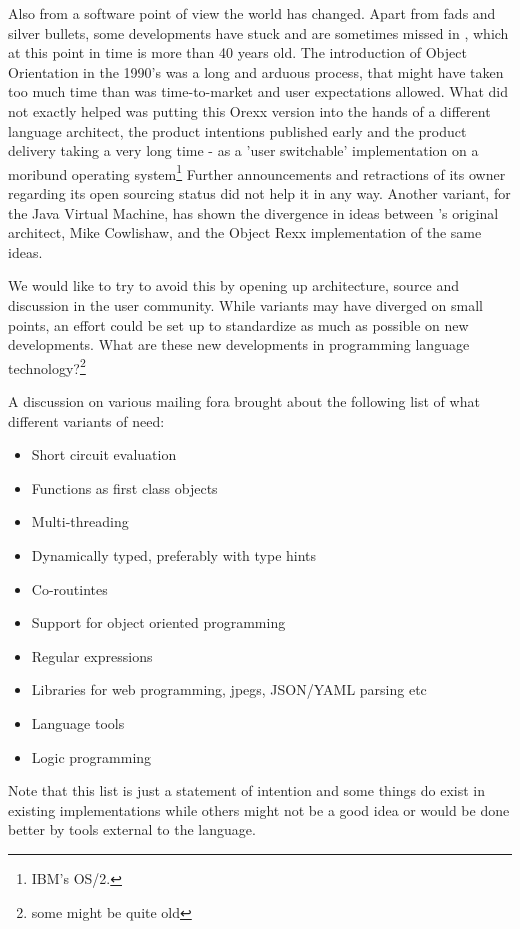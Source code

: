 Also from a software point of view the world has changed. Apart from
fads and silver bullets, some developments have stuck and are
sometimes missed in \rexx{}, which at this point in time is more than
40 years old. The introduction of Object Orientation in the 1990's was
a long and arduous process, that might have taken too much time than
was time-to-market and user expectations allowed. What did not exactly
helped was putting this Orexx version into the hands of a different
language architect, the product intentions published early and the
product delivery taking a very long time - as a 'user switchable'
implementation on a moribund operating
system\footnote{IBM's OS/2.} Further announcements and retractions
of its owner regarding its open sourcing status did not help it in any way.
Another variant, for the Java Virtual Machine, has shown the
divergence in ideas between \rexx{}'s original architect, Mike
Cowlishaw, and the Object Rexx implementation of the same ideas.

We would like to try to avoid this by opening up architecture, source
and discussion in the user community. While \rexx{} variants may have
diverged on small points, an effort could be set up to standardize as
much as possible on new developments. What are these new developments
in programming language technology?\footnote{some might be quite old}

A discussion on various mailing fora brought about the following list
of what different variants of \rexx{} need:
\begin{itemize}
\item Short circuit evaluation
\item Functions as first class objects
\item Multi-threading
\item Dynamically typed, preferably with type hints
\item Co-routintes
\item Support for object oriented programming
\item Regular expressions
\item Libraries for web programming, jpegs, JSON/YAML parsing etc
\item Language tools
\item Logic programming
\end{itemize}

Note that this list is just a statement of intention and some things
do exist in existing implementations while others might not be a
good idea or would be done better by tools external to the language.
  
